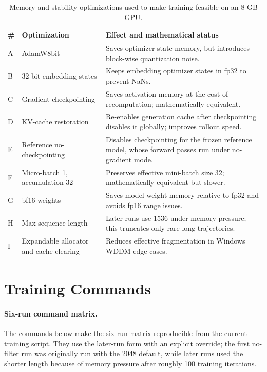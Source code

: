 \begin{table}[!htbp]
\centering
\small
\begin{tabularx}{\textwidth}{llX}
\toprule
\# & Optimization & Effect and mathematical status \\
\midrule
A & AdamW8bit & Saves optimizer-state memory, but introduces block-wise quantization noise. \\
B & 32-bit embedding states & Keeps embedding optimizer states in fp32 to prevent NaNs. \\
C & Gradient checkpointing & Saves activation memory at the cost of recomputation; mathematically equivalent. \\
D & KV-cache restoration & Re-enables generation cache after checkpointing disables it globally; improves rollout speed. \\
E & Reference no-checkpointing & Disables checkpointing for the frozen reference model, whose forward passes run under no-gradient mode. \\
F & Micro-batch 1, accumulation 32 & Preserves effective mini-batch size 32; mathematically equivalent but slower. \\
G & bf16 weights & Saves model-weight memory relative to fp32 and avoids fp16 range issues. \\
H & Max sequence length & Later runs use 1536 under memory pressure; this truncates only rare long trajectories. \\
I & Expandable allocator and cache clearing & Reduces effective fragmentation in Windows WDDM edge cases. \\
\bottomrule
\end{tabularx}
\caption{Memory and stability optimizations used to make training feasible on an 8 GB GPU.}
\label{tab:app_memory}
\end{table}

\clearpage
\section{Training Commands}
\label{sec:commands}

\paragraph{Six-run command matrix.}
The commands below make the six-run matrix reproducible from the current training script. They use the later-run form with an explicit  override; the first no-filter run was originally run with the 2048 default, while later runs used the shorter length because of memory pressure after roughly 100 training iterations.


